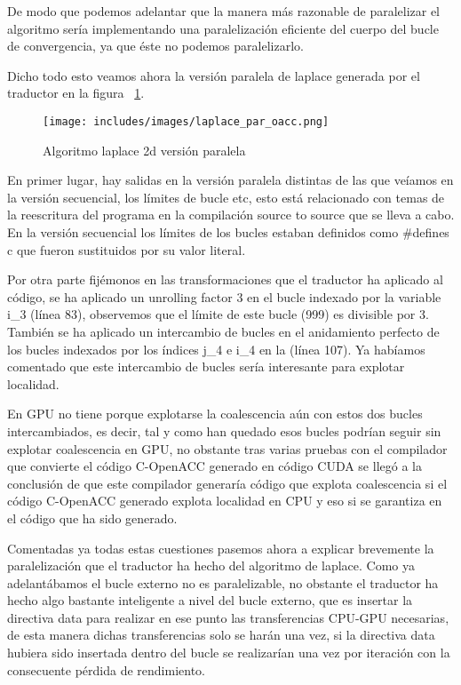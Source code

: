 De modo que podemos adelantar que la manera más razonable de paralelizar el algoritmo sería implementando una paralelización eficiente del cuerpo del bucle de convergencia, ya que éste no podemos paralelizarlo.

Dicho todo esto veamos ahora la versión paralela de laplace generada por el traductor en la figura ~\ref{fig:Laplaced2dpar}.

\begin{figure}[tph]
\centering
\texttt{[image: includes/images/laplace\_par\_oacc.png]}
\caption{Algoritmo laplace 2d versión paralela}
\label{fig:Laplaced2dpar}
\end{figure}

En primer lugar, hay salidas en la versión paralela distintas de las que veíamos en la versión secuencial, los límites de bucle etc, esto está relacionado con temas de la reescritura del programa en la compilación source to source que se lleva a cabo. En la versión secuencial los límites de los bucles estaban definidos como \#defines c que fueron sustituidos por su valor literal.

Por otra parte fijémonos en las transformaciones que el traductor ha aplicado al código, se ha aplicado un unrolling factor 3 en el bucle indexado por la variable i\_3 (línea 83), observemos que el límite de este bucle (999) es divisible por 3. También se ha aplicado un intercambio de bucles en el anidamiento perfecto de los bucles indexados por los índices j\_4 e i\_4 en la (línea 107). Ya habíamos comentado que este intercambio de bucles sería interesante para explotar localidad.

En GPU no tiene porque explotarse la coalescencia aún con estos dos bucles intercambiados, es decir, tal y como han quedado esos bucles podrían seguir sin explotar coalescencia en GPU, no obstante tras varias pruebas con el compilador que convierte el código C-OpenACC generado en código CUDA se llegó a la conclusión de que este compilador generaría código que explota coalescencia si el código C-OpenACC generado explota localidad en CPU y eso si se garantiza en el código que ha sido generado.

Comentadas ya todas estas cuestiones pasemos ahora a explicar brevemente la paralelización que el traductor ha hecho del algoritmo de laplace. Como ya adelantábamos el bucle externo no es paralelizable, no obstante el traductor ha hecho algo bastante inteligente a nivel del bucle externo, que es insertar la directiva data para realizar en ese punto las transferencias CPU-GPU necesarias, de esta manera dichas transferencias solo se harán una vez, si la directiva data hubiera sido insertada dentro del bucle se realizarían una vez por iteración con la consecuente pérdida de rendimiento.

